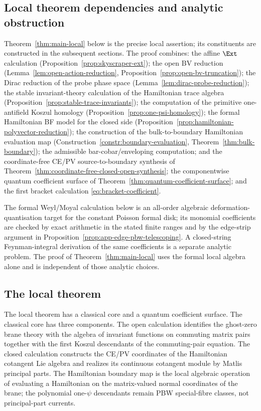 \documentclass[11pt]{memoir}
\begin{document}
\subsection{Local theorem dependencies and analytic obstruction}\label{ssec:quantum-target}

Theorem~\ref{thm:main-local} below is the precise local assertion;
its constituents are constructed in the subsequent sections. The proof
combines: the affine $\Ext$ calculation
(Proposition~\ref{prop:skyscraper-ext}); the open BV reduction
(Lemma~\ref{lem:open-action-reduction},
Proposition~\ref{prop:open-bv-truncation}); the Dirac reduction of the
probe phase space
(Lemma~\ref{lem:dirac-probe-reduction}); the stable invariant-theory
calculation of the Hamiltonian trace algebra
(Proposition~\ref{prop:stable-trace-invariants}); the computation of the
primitive one-antifield Koszul homology
(Proposition~\ref{prop:one-psi-homology}); the formal Hamiltonian BF model
for the closed side
(Proposition~\ref{prop:hamiltonian-polyvector-reduction}); the
construction of the bulk-to-boundary Hamiltonian evaluation map
(Construction~\ref{constr:boundary-evaluation},
Theorem~\ref{thm:bulk-boundary}); the admissible
bar-cobar/enveloping computation; and
	the coordinate-free CE/PV source-to-boundary synthesis of
Theorem~\ref{thm:coordinate-free-closed-open-synthesis}; the
componentwise quantum coefficient surface of
Theorem~\ref{thm:quantum-coefficient-surface}; and the first bracket
calculation \eqref{eq:bracket-coefficient}.

The formal Weyl/Moyal calculation below is an all-order algebraic
deformation-quantisation target for the constant Poisson formal disk; its
monomial coefficients are checked by exact arithmetic in the stated
finite ranges and by the edge-strip argument in
Proposition~\ref{prop:app-edge-pbw-telescoping}.  A closed-string
Feynman-integral derivation of the same coefficients is a separate
analytic problem.  The proof of Theorem~\ref{thm:main-local} uses the
formal local algebra alone and is independent of those analytic choices.

\subsection{The local theorem}\label{ssec:local-theorem}

The local theorem has a classical core and a quantum coefficient
surface.  The classical core has three components. The open calculation
identifies the ghost-zero brane theory with the algebra of invariant
functions on commuting matrix pairs together with the first Koszul
descendants of the commuting-pair equation. The closed calculation
constructs the CE/PV coordinates of the Hamiltonian cotangent Lie
algebra and realizes its continuous cotangent module by Matlis principal
parts. The Hamiltonian boundary map is the local algebraic operation of
evaluating a Hamiltonian on the matrix-valued normal coordinates of the
brane; the polynomial one-$\psi$ descendants remain PBW special-fibre
classes, not principal-part currents.
\end{document}
